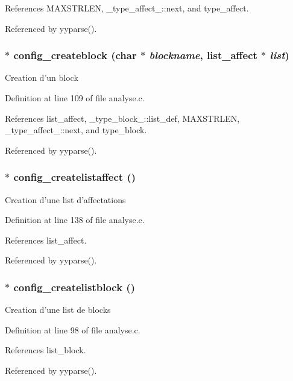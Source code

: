 References MAXSTRLEN, \_\-type\_\-affect\_\-::next, and type\_\-affect.

Referenced by yyparse().
\subsubsection{$\ast$ config\_\-createblock (char $\ast$ {\em blockname}, {\bf list\_\-affect} $\ast$ {\em list})}\label{analyse_8c_a1}


Creation d'un block 

Definition at line 109 of file analyse.c.

References list\_\-affect, \_\-type\_\-block\_\-::list\_\-def, MAXSTRLEN, \_\-type\_\-affect\_\-::next, and type\_\-block.

Referenced by yyparse().
\subsubsection{$\ast$ config\_\-createlistaffect ()}\label{analyse_8c_a3}


Creation d'une list d'affectations 

Definition at line 138 of file analyse.c.

References list\_\-affect.

Referenced by yyparse().
\subsubsection{$\ast$ config\_\-createlistblock ()}\label{analyse_8c_a0}


Creation d'une list de blocks 

Definition at line 98 of file analyse.c.

References list\_\-block.

Referenced by yyparse().
